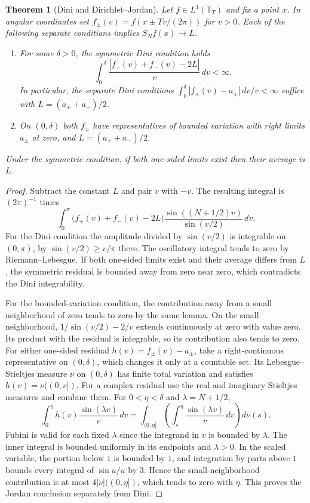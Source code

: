 \documentclass[11pt,oneside,openany]{book}
\newtheorem{theorem}{Theorem}[chapter]
\theoremstyle{definition}
\theoremstyle{remark}
\begin{document}
\begin{theorem}[Dini and Dirichlet--Jordan]
\label{p102:U1-02}
Let $f\in L^1(\mathbb T_T)$ and fix a point $x$. In angular
coordinates set $f_\pm(v)=f(x\pm Tv/(2\pi))$ for $v>0$.
Each of the following separate conditions implies $S_N f(x)\to L$.
\begin{enumerate}
\item For some $\delta>0$, the symmetric Dini condition holds
  \[
   \int_0^\delta\frac{|f_+(v)+f_-(v)-2L|}{v}\,dv<\infty .
  \]
  In particular, the separate Dini conditions
  $\int_0^\delta |f_\pm(v)-a_\pm|\,dv/v<\infty$ suffice with
  $L=(a_++a_-)/2$.
\item On $(0,\delta)$ both $f_\pm$ have representatives of bounded
  variation with right limits $a_\pm$ at zero, and $L=(a_++a_-)/2$.
\end{enumerate}
Under the symmetric condition, if both one-sided limits exist then
their average is $L$.
\end{theorem}

\begin{proof}
Subtract the constant $L$ and pair $v$ with $-v$.
The resulting integral is $(2\pi)^{-1}$ times
\[
 \int_0^\pi
   \bigl(f_+(v)+f_-(v)-2L\bigr)
      \frac{\sin((N+1/2)v)}{\sin(v/2)}\,dv .
\]
For the Dini condition the amplitude divided by $\sin(v/2)$ is
integrable on $(0,\pi)$, by $\sin(v/2)\ge v/\pi$ there. The
oscillatory integral tends to zero by Riemann--Lebesgue. If both
one-sided limits exist and their average differs from $L$, the
symmetric residual is bounded away from zero near zero, which
contradicts the Dini integrability.

For the bounded-variation condition, the contribution away from a
small neighborhood of zero tends to zero by the same lemma.
On the small neighborhood, $1/\sin(v/2)-2/v$ extends continuously
at zero with value zero. Its product with the residual is integrable,
so its contribution also tends to zero. For either one-sided residual
$h(v)=f_\pm(v)-a_\pm$, take a right-continuous representative on
$(0,\delta)$, which changes it only at a countable set. Its
Lebesgue--Stieltjes measure $\nu$ on $(0,\delta)$ has finite total
variation and satisfies $h(v)=\nu((0,v])$. For a complex residual
use the real and imaginary Stieltjes measures and combine them.
For $0<\eta<\delta$ and $\lambda=N+1/2$,
\[
 \int_0^\eta h(v)\frac{\sin(\lambda v)}{v}\,dv
  =\int_{(0,\eta]}
       \left(\int_s^\eta \frac{\sin(\lambda v)}v\,dv\right)d\nu(s).
\]
Fubini is valid for each fixed $\lambda$ since the integrand in
$v$ is bounded by $\lambda$. The inner integral is bounded
uniformly in its endpoints and $\lambda>0$. In the scaled variable,
the portion below $1$ is bounded by $1$, and integration by parts
above $1$ bounds every integral of $\sin u/u$ by $3$. Hence the
small-neighborhood contribution is at most $4|\nu|((0,\eta])$,
which tends to zero with $\eta$. This proves the Jordan conclusion
separately from Dini.
\end{proof}
\end{document}
